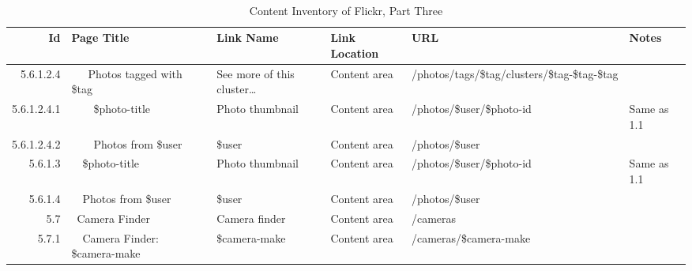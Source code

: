 \documentclass[12pt,a4paper]{article}
\begin{document}
\begin{landscape}
  \begin{table}[h!b!p!]
    \caption{Content Inventory of Flickr, Part Three}
    \label{table:flickr.content.inventory.3}
    \begin{center}
      \begin{tiny}
        \tt
        \begin{tabular}{r|l|l|l|l|p{3cm}}
            Id &
            Page Title &
            Link Name &
            Link Location &
            URL &
            Notes \\

            \hline

                    5.6.1.2.4 &
                    ~~~Photos tagged with \$tag &
                    See more of this cluster\ldots &
                    Content area &
                    /photos/tags/\$tag/clusters/\$tag-\$tag-\$tag &
                    \\

                      5.6.1.2.4.1 &
                      ~~~~\$photo-title &
                      Photo thumbnail &
                      Content area &
                      /photos/\$user/\$photo-id &
                      Same as 1.1 \\

                      5.6.1.2.4.2 &
                      ~~~~Photos from \$user &
                      \$user &
                      Content area &
                      /photos/\$user &
                      \\

                  5.6.1.3 &
                  ~~\$photo-title &
                  Photo thumbnail &
                  Content area &
                  /photos/\$user/\$photo-id &
                  Same as 1.1 \\

                  5.6.1.4 &
                  ~~Photos from \$user &
                  \$user &
                  Content area &
                  /photos/\$user &
                  \\

              5.7 &
              ~Camera Finder &
              Camera finder &
              Content area &
              /cameras &
              \\

                5.7.1 &
                ~~Camera Finder: \$camera-make &
                \$camera-make &
                Content area &
                /cameras/\$camera-make &
                \\


\end{tabular}
\end{tiny}
\end{center}
\end{table}
\end{landscape}
\end{document}
